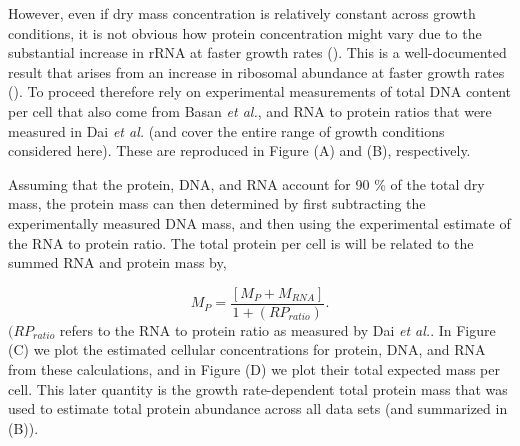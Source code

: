 However, even if dry mass concentration is relatively constant across growth
conditions, it is not obvious how protein concentration might vary due to
the substantial increase in rRNA at faster
growth rates (\cite{dai2016}). This is a well-documented result that arises from
an increase in ribosomal abundance at faster growth rates
(\cite{scott2010}). To proceed therefore rely on experimental
measurements of total DNA content per cell that also come from Basan \textit{et
al.}, and RNA to protein ratios that were measured in Dai \textit{et al.} (and
cover the entire range of growth conditions considered here). These are
reproduced in Figure (A) and (B),
respectively.

Assuming that the protein, DNA, and RNA account for 90 \% of the total dry mass,
the protein mass can then determined by first subtracting the experimentally
measured DNA mass,  and then using the experimental estimate of the RNA to
protein ratio. The total protein per cell is will be related to the summed RNA
and protein mass by,

\begin{equation}
	M_{P} = \frac{[M_P + M_{RNA}]}{1 + (RP_{ratio})}.
\end{equation}
$(RP_{ratio}$ refers to the RNA to protein ratio as measured by Dai \textit{et
al.}. In Figure (C) we plot the estimated
cellular concentrations for protein, DNA, and RNA from these calculations, and
in Figure (D) we plot their total expected
mass per cell. This later quantity is the growth rate-dependent total protein
mass that was used to estimate total protein abundance across all data sets (and
summarized in (B)).


